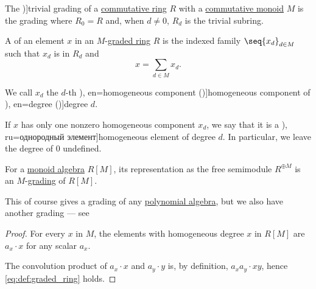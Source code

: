 \begin{definition}\label{def:trivial_ring_grading}
  The \term[en=trivial (graduation) (\cite[457]{Bourbaki1998Algebra1to3})]{trivial grading} of a \hyperref[def:ring/commutative]{commutative ring} \( R \) with a \hyperref[def:monoid/commutative]{commutative monoid} \( M \) is the grading where \( R_0 = R \) and, when \( d \neq 0 \), \( R_d \) is the trivial subring.
\end{definition}

\begin{definition}\label{def:homogeneous_element}
  A  of an element \( x \) in an \( M \)-\hyperref[def:graded_ring]{graded ring} \( R \) is the indexed family \( \seq{ x_d }_{d \in M} \) such that \( x_d \) is in \( R_d \) and
  \begin{equation}
    x = \sum_{d \in M} x_d.
  \end{equation}

  We call \( x_d \) the \( d \)-th \term[bg=еднородна компонента (\cite[57]{КоцевСидеров2016КомутативнаАлгебра}), en=homogeneous component (\cite[363]{Bourbaki1998Algebra1to3})]{homogeneous component} of \term[bg=степен (\cite[57]{КоцевСидеров2016КомутативнаАлгебра}), en=degree (\cite[363]{Bourbaki1998Algebra1to3})]{degree} \( d \).

  If \( x \) has only one nonzero homogeneous component \( x_d \), we say that it is a \term[bg=еднороден елемент (\cite[57]{КоцевСидеров2016КомутативнаАлгебра}), ru=однородный элемент]{homogeneous element} of degree \( d \). In particular, we leave the degree of \( 0 \) undefined.
\end{definition}

\begin{proposition}\label{thm:semigroup_algebra_grading}
  For a \hyperref[def:semigroup_algebra]{monoid algebra} \( R[M] \), its representation as the free semimodule \( R^{\oplus M} \) is an \( M \)-\hyperref[def:graded_ring]{grading} of \( R[M] \).
\end{proposition}
\begin{comments}
  \item This of course gives a grading of any \hyperref[def:polynomial_algebra]{polynomial algebra}, but we also have another grading --- see 
\end{comments}
\begin{proof}
  For every \( x \) in \( M \), the elements with homogeneous degree \( x \) in \( R[M] \) are \( a_x \cdot x \) for any scalar \( a_x \).

  The convolution product of \( a_x \cdot x \) and \( a_y \cdot y \) is, by definition, \( a_x a_y \cdot xy \), hence \eqref{eq:def:graded_ring} holds.
\end{proof}

